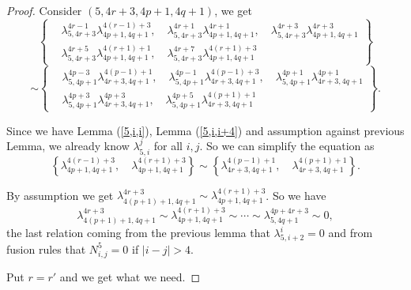 \documentclass{article}
\begin{document}
\begin{proof}
Consider $(5,4r+3,4p+1,4q+1)$,
we get
$$\left\{\begin{aligned}
&\lambda_{5,4r+3}^{4r-1}\lambda_{4p+1,4q+1}^{4(r-1)+3},\quad
\lambda_{5,4r+3}^{4r+1}\lambda_{4p+1,4q+1}^{4r+1},\quad
\lambda_{5,4r+3}^{4r+3}\lambda_{4p+1,4q+1}^{4r+3}\\
&\lambda_{5,4r+3}^{4r+5}\lambda_{4p+1,4q+1}^{4(r+1)+1},\quad
\lambda_{5,4r+3}^{4r+7}\lambda_{4p+1,4q+1}^{4(r+1)+3}
\end{aligned}\right\}
$$
$$
\sim\left\{\begin{aligned}
 & \lambda_{5,4p+1}^{4p-3}\lambda_{4r+3,4q+1}^{4(p-1)+1},\quad
\lambda_{5,4p+1}^{4p-1}\lambda_{4r+3,4q+1}^{4(p-1)+3},\quad
\lambda_{5,4p+1}^{4p+1}\lambda_{4r+3,4q+1}^{4p+1}\\
&\lambda_{5,4p+1}^{4p+3}\lambda_{4r+3,4q+1}^{4p+3},\quad
\lambda_{5,4p+1}^{4p+5}\lambda_{4r+3,4q+1}^{4(p+1)+1}
\end{aligned}
\right\}.
$$

Since we have Lemma (\ref{5,i,i}), Lemma (\ref{5,i,i+4}) and assumption against previous Lemma,
we already know $\lambda_{5,i}^j$ for all $i,j$.
So we can simplify the equation as
$$\left\{\lambda_{4p+1,4q+1}^{4(r-1)+3},\quad
\lambda_{4p+1,4q+1}^{4(r+1)+3}
\right\}
\sim 
\left\{\lambda_{4r+3,4q+1}^{4(p-1)+1},\quad
\lambda_{4r+3,4q+1}^{4(p+1)+1}\right\}.$$

By assumption we get $\lambda_{4(p+1)+1,4q+1}^{4r+3}\sim\lambda_{4p+1,4q+1}^{4(r+1)+3}$.
So we have
$$\lambda_{4(p+1)+1,4q+1}^{4r+3}\sim\lambda_{4p+1,4q+1}^{4(r+1)+3}\sim\cdots\sim\lambda_{5,4q+1}^{4p+4r+3}\sim 0,$$
the last relation coming from the previous lemma that
$\lambda_{5,i+2}^i=0$
and from fusion rules that $N_{i,j}^5=0$ if $|i-j|>4$.

Put $r=r'$ and we get what we need.
\end{proof}

\end{document}
